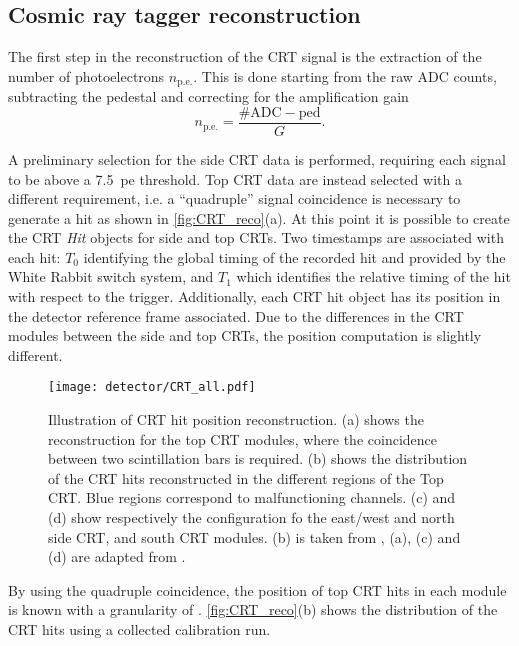 \subsection{Cosmic ray tagger reconstruction} 

The first step in the reconstruction of the CRT signal is the extraction of the number of photoelectrons $n_\mathrm{p.e.}$. This is done starting from the raw ADC counts, subtracting the pedestal and correcting for the amplification gain \begin{equation}
    n_\mathrm{p.e.} = \frac{\mathrm{\#ADC} - \mathrm{ped}}{G}. 
\end{equation} 

A preliminary selection for the side CRT data is performed, requiring each signal to be above a \SI{7.5}{pe} threshold. Top CRT data are instead selected with a different requirement, i.e. a ``quadruple'' signal coincidence is necessary to generate a hit as shown in \autoref{fig:CRT_reco}(a). At this point it is possible to create the CRT \emph{Hit} objects for side and top CRTs. Two timestamps are associated with each hit: $T_0$ identifying the global timing of the recorded hit and provided by the White Rabbit switch system, and $T_1$ which identifies the relative timing of the hit with respect to the trigger. Additionally, each CRT hit object has its position in the detector reference frame associated. Due to the differences in the CRT modules between the side and top CRTs, the position computation is slightly different. 

\begin{figure}
    \centering
    \texttt{[image: detector/CRT\_all.pdf]}
    \caption[CRT Hit reconstruction in space]{Illustration of CRT hit position reconstruction. (a) shows the reconstruction for the top CRT modules, where the coincidence between two scintillation bars is required. (b) shows the distribution of the CRT hits reconstructed in the different regions of the Top CRT. Blue regions correspond to malfunctioning channels. (c) and (d) show respectively the configuration fo the east/west and north side CRT, and south CRT modules. (b) is taken from \cite{Poppi:2023zmp}, (a), (c) and (d) are adapted from \cite{arteroponsStudyReconstructionNuMuCC}.}
    \label{fig:CRT_reco}
\end{figure}

By using the quadruple coincidence, the position of top CRT hits in each module is known with a granularity of . \autoref{fig:CRT_reco}(b) shows the distribution of the CRT hits using a collected calibration run. 

